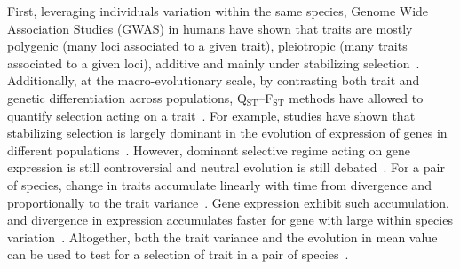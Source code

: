 \documentclass{article}
\begin{document}
First, leveraging individuals variation within the same species, Genome Wide Association Studies (GWAS) in humans have shown that traits are mostly polygenic (many loci associated to a given trait), pleiotropic (many traits associated to a given loci), additive and mainly under stabilizing selection~\cite{simons_population_2018, sella_thinking_2019}.
Additionally, at the macro-evolutionary scale, by contrasting both trait and genetic differentiation across populations, Q$_\text{ST}$--F$_\text{ST}$ methods have allowed to quantify selection acting on a trait~\cite{martin_multivariate_2008, leinonen_qst_2013}.
For example, studies have shown that stabilizing selection is largely dominant in the evolution of expression of genes in different populations~\cite{whitehead_neutral_2006, gilad_natural_2006}.
However, dominant selective regime acting on gene expression is still controversial and neutral evolution is still debated~\cite{signor_evolution_2018, price_detecting_2022}.
For a pair of species, change in traits accumulate linearly with time from divergence and proportionally to the trait variance~\cite{lande_genetic_1980, turelli_heritable_1984}.
Gene expression exhibit such accumulation, and divergence in expression accumulates faster for gene with large within species variation~\cite{khaitovich_neutral_2004}.
Altogether, both the trait variance and the evolution in mean value can be used to test for a selection of trait in a pair of species~\cite{walsh_evolution_2018}.
\end{document}
